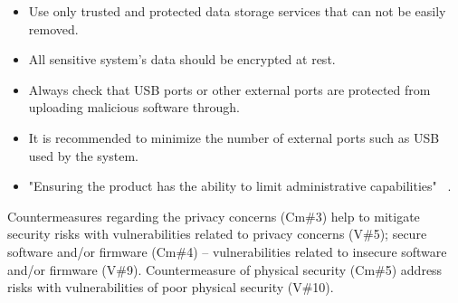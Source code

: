 \documentclass[12pt]{article}
\begin{document}
\begin{enumerate}
\begin{itemize}
			\item Use only trusted and protected data storage services that can not be easily removed.
			\item All sensitive system's data should be encrypted at rest.
			\item  Always check that USB ports or other external ports are protected from uploading malicious software through.
			\item It is recommended to minimize the number of external ports such as USB used by the system.
			\item "Ensuring the product has the ability to limit administrative capabilities" ~\cite{OWASP}.
		\end{itemize}
\end{enumerate}

Countermeasures regarding the privacy concerns (Cm\#3) help to mitigate
security risks with vulnerabilities related to privacy concerns (V\#5); secure
software and/or firmware (Cm\#4) – vulnerabilities related to insecure software
and/or firmware (V\#9). Countermeasure of physical security (Cm\#5) address
risks with vulnerabilities of poor physical security (V\#10).
\end{document}
